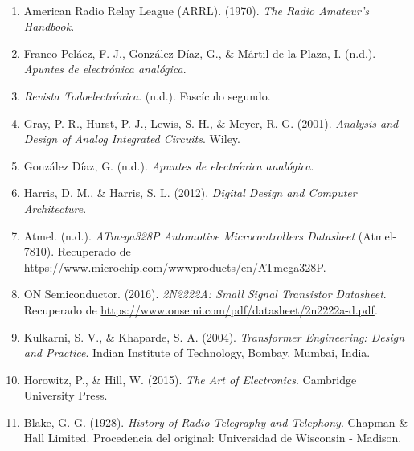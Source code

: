 \paragraph{}
\begin{enumerate}
\item American Radio Relay League (ARRL). (1970). \textit{The Radio Amateur's Handbook}.
\item Franco Peláez, F. J., González Díaz, G., \& Mártil de la Plaza, I. (n.d.). \textit{Apuntes de electrónica analógica}.
\item \textit{Revista Todoelectrónica}. (n.d.). Fascículo segundo.
\item Gray, P. R., Hurst, P. J., Lewis, S. H., \& Meyer, R. G. (2001). \textit{Analysis and Design of Analog Integrated Circuits}. Wiley.
\item González Díaz, G. (n.d.). \textit{Apuntes de electrónica analógica}.
\item Harris, D. M., \& Harris, S. L. (2012). \textit{Digital Design and Computer Architecture}. 
\item Atmel. (n.d.). \textit{ATmega328P Automotive Microcontrollers Datasheet} (Atmel-7810). Recuperado de \url{https://www.microchip.com/wwwproducts/en/ATmega328P}.
\item ON Semiconductor. (2016). \textit{2N2222A: Small Signal Transistor Datasheet}. Recuperado de \url{https://www.onsemi.com/pdf/datasheet/2n2222a-d.pdf}.
\item Kulkarni, S. V., \& Khaparde, S. A. (2004). \textit{Transformer Engineering: Design and Practice}. Indian Institute of Technology, Bombay, Mumbai, India.
\item Horowitz, P., \& Hill, W. (2015). \textit{The Art of Electronics}. Cambridge University Press.
\item {Blake, G. G. (1928). \textit{History of Radio Telegraphy and Telephony}. Chapman \& Hall Limited. Procedencia del original: Universidad de Wisconsin - Madison.}

\end{enumerate}
